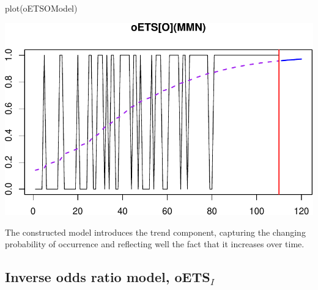 \documentclass[
]{book}
\newenvironment{Shaded}{\begin{snugshade}}{\end{snugshade}}
\newcommand{\FunctionTok}[1]{\textcolor[rgb]{0.00,0.00,0.00}{#1}}
\newcommand{\NormalTok}[1]{#1}
\theoremstyle{definition}
\theoremstyle{definition}
\theoremstyle{definition}
\theoremstyle{definition}
\theoremstyle{remark}
\begin{document}
\begin{Shaded}
\begin{Highlighting}[]
\FunctionTok{plot}\NormalTok{(oETSOModel)}
\end{Highlighting}
\end{Shaded}

\includegraphics{adam_files/figure-latex/oETSOExample1-1.pdf}

The constructed model introduces the trend component, capturing the changing probability of occurrence and reflecting well the fact that it increases over time.

\hypertarget{inverse-odds-ratio-model-oets_i}{%
\subsection{\texorpdfstring{Inverse odds ratio model, oETS\(_I\)}{Inverse odds ratio model, oETS\_I}}\label{inverse-odds-ratio-model-oets_i}}
\end{document}

